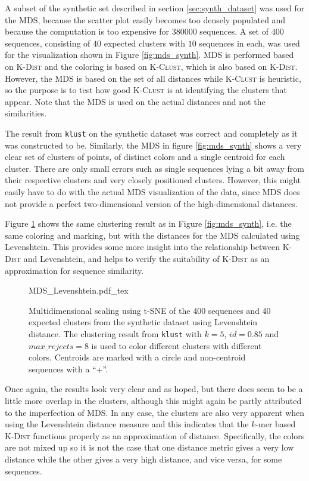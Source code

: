 A subset of the synthetic set described in section \ref{sec:synth_dataset} was
used for the MDS, because the scatter plot easily becomes too densely
populated and because the computation is too expensive for \num{380000}
sequences. A set of $400$ sequences, consisting of $40$ expected clusters with
$10$ sequences in each, was used for the visualization shown in Figure
\ref{fig:mds_synth}. MDS is performed based on \textsc{K-Dist} and the
coloring is based on \textsc{K-Clust}, which is also based on \textsc{K-Dist}.
However, the MDS is based on the set of all distances while \textsc{K-Clust}
is heuristic, so the purpose is to test how good \textsc{K-Clust} is at
identifying the clusters that appear. Note that the MDS is used on the actual
distances and not the similarities.

The result from \texttt{klust} on the synthetic dataset was correct and
completely as it was constructed to be. Similarly, the MDS in figure
\ref{fig:mds_synth} shows a very clear set of clusters of points, of distinct
colors and a single centroid for each cluster. There are only small errors such
as single sequences lying a bit away from their respective clusters and very
closely positioned clusters. However, this might easily have to do with the
actual MDS visualization of the data, since MDS does not provide a perfect
two-dimensional version of the high-dimensional distances.

Figure \ref{fig:mds_synth_lev} shows the same clustering result as in Figure
\ref{fig:mds_synth}, i.e. the same coloring and marking, but with the distances
for the MDS calculated using Levenshtein. This provides some more insight
into the relationship between \textsc{K-Dist} and Levenshtein, and helps to
verify the suitability of \textsc{K-Dist} as an approximation for sequence
similarity.

\begin{figure}[h!]
  \centering
  \def\svgwidth{\columnwidth}
  {MDS_Levenshtein.pdf_tex}
  \caption{Multidimensional scaling using t-SNE of the 400 sequences and 40
    expected clusters from the synthetic dataset using Levenshtein distance.
    The clustering result from \texttt{klust} with $k=5$, $id=0.85$ and
    $max\_rejects=8$ is used to color different clusters with different
    colors. Centroids are marked with a circle and non-centroid sequences
    with a ``+''.}
  \label{fig:mds_synth_lev}
\end{figure}

Once again, the results look very clear and as hoped, but there does seem to be
a little more overlap in the clusters, although this might again be partly
attributed to the imperfection of MDS. In any case, the clusters are also very
apparent when using the Levenshtein distance measure and this indicates that
the $k$-mer based \textsc{K-Dist} functions properly as an approximation of
distance. Specifically, the colors are not mixed up so it is not the case that
one distance metric gives a very low distance while the other gives a very
high distance, and vice versa, for some sequences.


